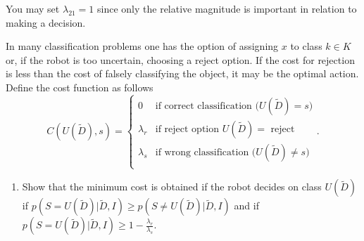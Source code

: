 \begin{example}
\begin{enumerate}
		You may set $\lambda_{21}=1$ since only the relative magnitude is important in relation to making a decision.
		
	\end{enumerate}
	
	
\end{example}


\begin{example}
	In many classification problems one has the option of assigning $x$ to class $k\in K$ or, if the robot is too uncertain, choosing a reject option. If the cost for rejection is less than the cost of falsely classifying the object, it may be the optimal action. Define the cost function as follows
	\begin{equation}
		C(U(\tilde{D}),s)=\begin{cases}
			0 & \text{if correct classification ($U(\tilde{D})=s$)}\\
			\lambda_r & \text{if reject option $U(\tilde{D})=$ reject}\\
			\lambda_s & \text{if wrong classification ($U(\tilde{D})\neq s$)}\\
		\end{cases}.
	\end{equation}
	
	\begin{enumerate}
		\item Show that the minimum cost is obtained if the robot decides on class $U(\tilde{D})$ if $p(S=U(\tilde{D})|\tilde{D},I)\geq p(S\neq U(\tilde{D})|\tilde{D},I)$ and if $p(S=U(\tilde{D})|\tilde{D},I)\geq 1-\frac{\lambda_r}{\lambda_s}$.\newline
		

\end{enumerate}
\end{example}
